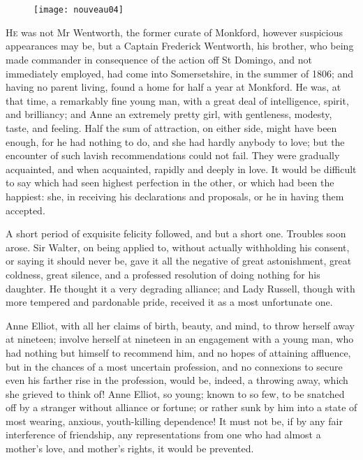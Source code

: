 \chapter[Chapter \thechapter]{}
	
	\begin{figure}[t!]
\centering
\texttt{[image: nouveau04]}
\end{figure}

\lettrine[lines=4,lraise=0.3]{H}{e} was not Mr Wentworth, the former curate of Monkford, however suspicious appearances may be, but a Captain Frederick Wentworth, his brother, who being made commander in consequence of the action off St Domingo, and not immediately employed, had come into Somersetshire, in the summer of 1806; and having no parent living, found a home for half a year at Monkford. He was, at that time, a remarkably fine young man, with a great deal of intelligence, spirit, and brilliancy; and Anne an extremely pretty girl, with gentleness, modesty, taste, and feeling. Half the sum of attraction, on either side, might have been enough, for he had nothing to do, and she had hardly anybody to love; but the encounter of such lavish recommendations could not fail. They were gradually acquainted, and when acquainted, rapidly and deeply in love. It would be difficult to say which had seen highest perfection in the other, or which had been the happiest: she, in receiving his declarations and proposals, or he in having them accepted.

A short period of exquisite felicity followed, and but a short one. Troubles soon arose. Sir Walter, on being applied to, without actually withholding his consent, or saying it should never be, gave it all the negative of great astonishment, great coldness, great silence, and a professed resolution of doing nothing for his daughter. He thought it a very degrading alliance; and Lady Russell, though with more tempered and pardonable pride, received it as a most unfortunate one.

Anne Elliot, with all her claims of birth, beauty, and mind, to throw herself away at nineteen; involve herself at nineteen in an engagement with a young man, who had nothing but himself to recommend him, and no hopes of attaining affluence, but in the chances of a most uncertain profession, and no connexions to secure even his farther rise in the profession, would be, indeed, a throwing away, which she grieved to think of! Anne Elliot, so young; known to so few, to be snatched off by a stranger without alliance or fortune; or rather sunk by him into a state of most wearing, anxious, youth-killing dependence! It must not be, if by any fair interference of friendship, any representations from one who had almost a mother's love, and mother's rights, it would be prevented.

